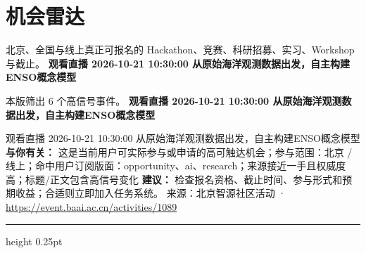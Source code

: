 \documentclass[10.5pt]{ctexart}
\begin{document}
\section*{机会雷达}
{\color{ormuted} 北京、全国与线上真正可报名的 Hackathon、竞赛、科研招募、实习、Workshop 与截止。}
\vspace{2mm}
{\LARGE\bfseries 观看直播 2026-10-21 10:30:00 从原始海‮观洋‬测数据出发，自主构建ENSO概念模型}\par
\vspace{1mm}
{\color{ormuted} 本版筛出 6 个高信号事件。}
\vspace{3mm}
{\Large\bfseries 观看直播 2026-10-21 10:30:00 从原始海‮观洋‬测数据出发，自主构建ENSO概念模型}\par
观看直播 2026-10-21 10:30:00 从原始海‮观洋‬测数据出发，自主构建ENSO概念模型
\textbf{与你有关：} 这是当前用户可实际参与或申请的高可触达机会；参与范围：北京 / 线上；命中用户订阅版面：opportunity、ai、research；来源接近一手且权威度高；标题/正文包含高信号变化
\textbf{建议：} 检查报名资格、截止时间、参与形式和预期收益；合适则立即加入任务系统。
{\footnotesize\color{ormuted} 来源：北京智源社区活动 · \url{https://event.baai.ac.cn/activities/1089}}
\vspace{4mm}
\hrule height 0.25pt
\vspace{3mm}
\end{document}
